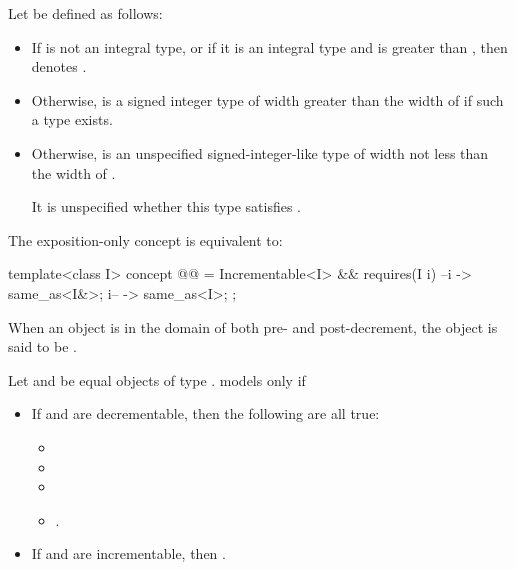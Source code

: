 \pnum
Let  be defined as follows:
\begin{itemize}
\item
  If  is not an integral type, or
  if it is an integral type and 
  is greater than ,
  then  denotes .
\item
  Otherwise, 
  is a signed integer type of width greater than the width of 
  if such a type exists.
\item
  Otherwise, 
  is an unspecified signed-integer-like type
  of width not less than the width of .
  \begin{note}
  It is unspecified
  whether this type satisfies .
  \end{note}
\end{itemize}

\pnum
The exposition-only  concept is equivalent to:
\begin{itemdecl}
template<class I>
  concept @@ =
    Incrementable<I> && requires(I i) {
      { --i } -> same_as<I&>;
      { i-- } -> same_as<I>;
    };
\end{itemdecl}

\begin{itemdescr}
\pnum
When an object is in the domain of both pre- and post-decrement,
the object is said to be .

\pnum
Let  and  be equal objects of type .
 models  only if
\begin{itemize}
\item If  and  are decrementable,
  then the following are all true:
  \begin{itemize}
  \item {}
  \item {}
  \item {}
  \item {}.
  \end{itemize}
\item If  and  are incrementable,
  then .
\end{itemize}
\end{itemdescr}


